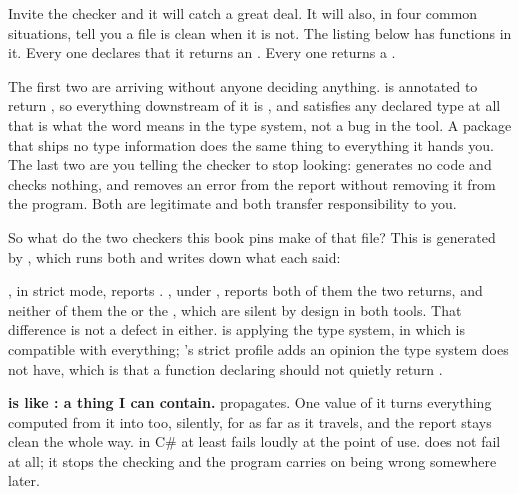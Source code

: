 Invite the checker and it will catch a great deal. It will also, in four
common situations, tell you a file is clean when it is not. The listing below
has  functions in it. Every one declares that it
returns an . Every one returns a .


\noindent
The first two are  arriving without anyone deciding anything.
 is annotated to return , so everything downstream
of it is , and  satisfies any declared type at all
\dash{} that is what the word means in the type system, not a bug in the
tool. A package that ships no type information does the same thing to
everything it hands you. The last two are you telling the checker to stop
looking:  generates no code and checks nothing, and
 removes an error from the report without removing it from
the program. Both are legitimate and both transfer responsibility to you.

So what do the two checkers this book pins make of that file? This is
generated by , which runs both and writes down
what each said:


\noindent
{}, in strict mode, reports .
, under , reports  \dash{}
both of them the two  returns, and neither of them the  or
the , which are silent by design in both tools. That
difference is not a defect in either.  is applying the type
system, in which  is compatible with everything; 's strict
profile adds an opinion the type system does not have, which is that a
function declaring  should not quietly return .

\begin{trapbox}
\textbf{ is like : a thing I can contain.} 
propagates. One value of it turns everything computed from it into 
too, silently, for as far as it travels, and the report stays clean the whole
way.  in C\# at least fails loudly at the point of use.
 does not fail at all; it stops the checking and the program carries
on being wrong somewhere later.
\end{trapbox}

